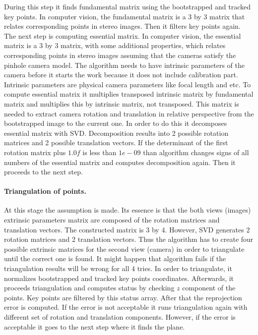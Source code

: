 \documentclass[../../main]{subfiles}
\begin{document}
During this step it finds fundamental matrix using the bootstrapped and tracked key points. In computer vision, the fundamental matrix is a 3 by 3 matrix that relates corresponding points in stereo images. Then it filters key points again. The next step is computing essential matrix. In computer vision, the essential matrix is a 3 by 3 matrix, with some additional properties, which relates corresponding points in stereo images assuming that the cameras satisfy the pinhole camera model. The algorithm needs to have intrinsic parameters of the camera before it starts the work because it does not include calibration part. Intrinsic parameters are physical camera parameters like focal length and etc. To compute essential matrix it multiplies transposed intrinsic matrix by fundamental matrix and multiplies this by intrinsic matrix, not transposed. This matrix is needed to extract camera rotation and translation in relative perspective from the bootstrapped image to the current one. In order to do this it decomposes essential matrix with \ac{SVD}. Decomposition results into 2 possible rotation matrices and 2 possible translation vectors. If the determinant of the first rotation matrix plus $1.0f$ is less than $1e-09$ than algorithm changes signs of all numbers of the essential matrix and computes decomposition again. Then it proceeds to the next step.

\paragraph*{Triangulation of points.}

At this stage the assumption is made. Its essence is that the both views (images) extrinsic parameters matrix are composed of the rotation matrices and translation vectors. The constructed matrix is 3 by 4. However, \ac{SVD} generates 2 rotation matrices and 2 translation vectors. Thus the algorithm has to create four possible extrinsic matrices for the second view (camera) in order to triangulate until the correct one is found. It might happen that algorithm fails if the triangulation results will be wrong for all 4 tries.  In order to triangulate, it normalizes bootstrapped and tracked key points coordinates. Afterwards, it proceeds triangulation and computes status by checking $z$ component of the points. Key points are filtered by this status array. After that the reprojection error is computed. If the error is not acceptable it runs triangulation again with different set of rotation and translation components. However, if the error is acceptable it goes to the next step where it finds the plane.
\end{document}
